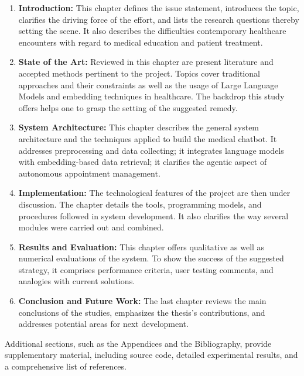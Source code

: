 \begin{enumerate}[itemsep=2em]
    \item \textbf{Introduction:} This chapter defines the issue statement, introduces the topic, clarifies the driving force of the effort, and lists the research questions thereby setting the scene. It also describes the difficulties contemporary healthcare encounters with regard to medical education and patient treatment.
    
    \item \textbf{State of the Art:} Reviewed in this chapter are present literature and accepted methods pertinent to the project. Topics cover traditional approaches and their constraints as well as the usage of Large Language Models and embedding techniques in healthcare. The backdrop this study offers helps one to grasp the setting of the suggested remedy.
    
    \item \textbf{System Architecture:} This chapter describes the general system architecture and the techniques applied to build the medical chatbot. It addresses preprocessing and data collecting; it integrates language models with embedding-based data retrieval; it clarifies the agentic aspect of autonomous appointment management.
    
    \item \textbf{Implementation:} The technological features of the project are then under discussion. The chapter details the tools, programming models, and procedures followed in system development. It also clarifies the way several modules were carried out and combined.
    
    \item \textbf{Results and Evaluation:} This chapter offers qualitative as well as numerical evaluations of the system. To show the success of the suggested strategy, it comprises performance criteria, user testing comments, and analogies with current solutions.
    
    \item \textbf{Conclusion and Future Work:} The last chapter reviews the main conclusions of the studies, emphasizes the thesis's contributions, and addresses potential areas for next development.
\end{enumerate}

Additional sections, such as the Appendices and the Bibliography, provide supplementary material, including source code, detailed experimental results, and a comprehensive list of references.
